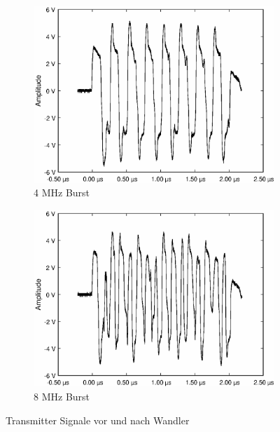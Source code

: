 \begin{figure}[h!]
\begin{subfigure}[t]{0.31\textwidth}
	    \label{fig:tx2in}
	\end{subfigure}%
    \hfil %
    \begin{subfigure}[t]{0.31\textwidth}
    	\includegraphics[width=\textwidth, trim= 0mm 0mm 0mm 0mm, clip=true]{images/tests/tx/4MHz-in.eps}%
    	\caption{4 MHz Burst}
	    \label{fig:tx4in}
    \end{subfigure}
    \hfil %
    \begin{subfigure}[t]{0.31\textwidth}
    	\includegraphics[width=\textwidth, trim= 0mm 0mm 0mm 0mm, clip=true]{images/tests/tx/8MHz-in.eps}%
    	\caption{8 MHz Burst}
	    \label{fig:tx8in}
    \end{subfigure}
	\caption{Transmitter Signale vor und nach Wandler}
	\label{fig:tx_measure}
\end{figure}\\
